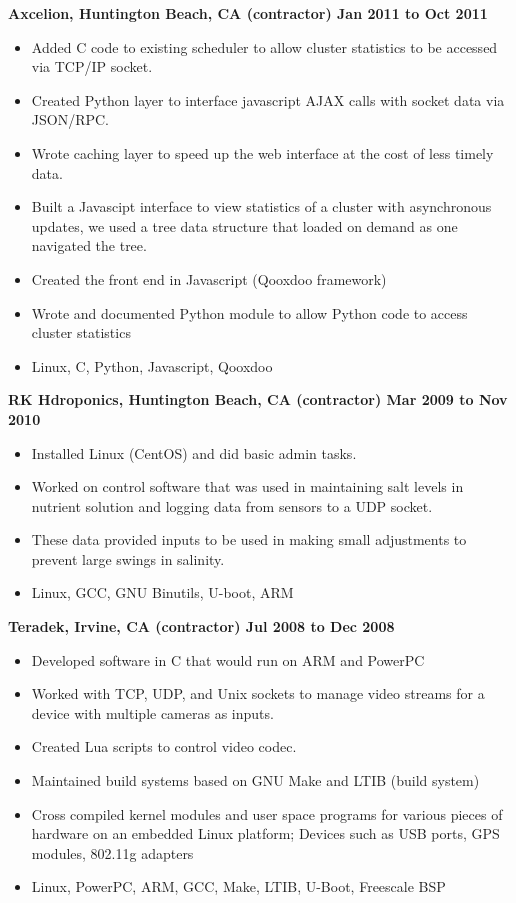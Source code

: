 \documentclass{res}
\begin{document}
\begin{resume}
{\large \bf Axcelion, Huntington Beach, CA (contractor) \hfill Jan 2011 to Oct 2011}
\begin{itemize}
\item Added  C code to existing scheduler to allow cluster statistics to
be accessed via TCP/IP socket.
\item Created Python layer to interface javascript AJAX calls with
socket data via JSON/RPC.
\item Wrote caching layer to speed up the web interface at the cost of
less timely data.
\item Built a Javascipt interface to view statistics of a cluster with
asynchronous updates, we used a tree data structure that loaded on
demand as one navigated the tree.
\item Created the front end in Javascript (Qooxdoo framework)
\item Wrote and documented Python module to allow Python code to
access cluster statistics
\item Linux, C, Python, Javascript, Qooxdoo
\end{itemize}

{\large \bf RK Hdroponics, Huntington Beach, CA (contractor) \hfill Mar 2009 to Nov 2010}
\begin{itemize}
\item Installed Linux (CentOS) and did basic admin tasks.
\item Worked on control software that was used in maintaining salt
levels in nutrient solution and logging data from sensors to a UDP socket.
\item These data provided inputs to be used in making small adjustments
to prevent large swings in salinity.
\item Linux, GCC, GNU Binutils, U-boot, ARM
\end{itemize}

{\large \bf Teradek, Irvine, CA (contractor) \hfill Jul 2008 to Dec 2008}
\begin{itemize}
\item Developed software in C that would run on ARM and PowerPC
\item Worked with TCP, UDP, and Unix sockets to manage video streams for
a device with multiple cameras as inputs.
\item Created Lua scripts to control video codec.
\item Maintained build systems based on GNU Make and LTIB (build system)
\item Cross compiled kernel modules and user space programs for various
pieces of hardware on an embedded Linux platform; Devices such as USB
ports, GPS modules, 802.11g adapters
\item  Linux, PowerPC, ARM, GCC, Make, LTIB, U-Boot, Freescale BSP
\end{itemize}


\end{resume}
\end{document}
